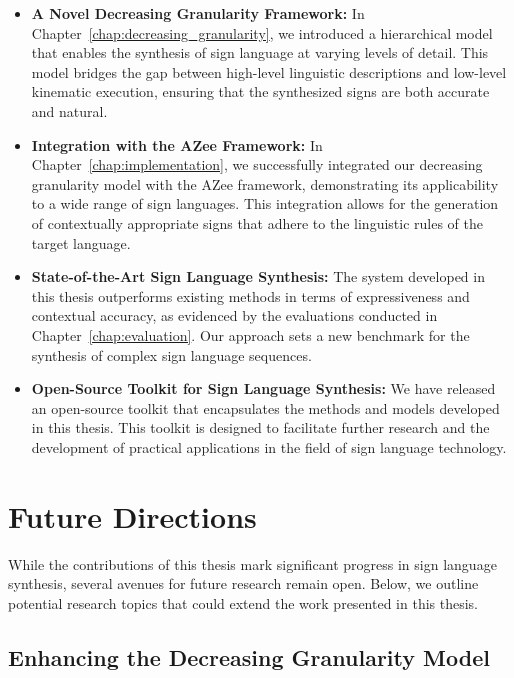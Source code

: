 \documentclass[../../main.tex]{subfiles}
\begin{document}
\begin{itemize}
    \item \textbf{A Novel Decreasing Granularity Framework:} In Chapter~\ref{chap:decreasing_granularity}, we introduced a hierarchical model that enables the synthesis of sign language at varying levels of detail. This model bridges the gap between high-level linguistic descriptions and low-level kinematic execution, ensuring that the synthesized signs are both accurate and natural.

    \item \textbf{Integration with the AZee Framework:} In Chapter~\ref{chap:implementation}, we successfully integrated our decreasing granularity model with the AZee framework, demonstrating its applicability to a wide range of sign languages. This integration allows for the generation of contextually appropriate signs that adhere to the linguistic rules of the target language.

    \item \textbf{State-of-the-Art Sign Language Synthesis:} The system developed in this thesis outperforms existing methods in terms of expressiveness and contextual accuracy, as evidenced by the evaluations conducted in Chapter~\ref{chap:evaluation}. Our approach sets a new benchmark for the synthesis of complex sign language sequences.

    \item \textbf{Open-Source Toolkit for Sign Language Synthesis:} We have released an open-source toolkit that encapsulates the methods and models developed in this thesis. This toolkit is designed to facilitate further research and the development of practical applications in the field of sign language technology.
\end{itemize}

\section{Future Directions}
\label{sec:future}

While the contributions of this thesis mark significant progress in sign language synthesis, several avenues for future research remain open. Below, we outline potential research topics that could extend the work presented in this thesis.

\subsection{Enhancing the Decreasing Granularity Model}
\end{document}
